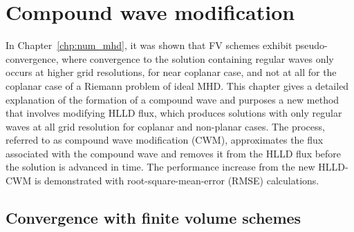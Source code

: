 %
%


\chapter[Compound wave modification]{Compound wave modification}
\label{chp:cwm}

In Chapter~\ref{chp:num_mhd}, it was shown that FV schemes exhibit pseudo-convergence, where convergence to the solution containing regular waves only occurs at higher grid resolutions, for near coplanar case, and not at all for the coplanar case of a Riemann problem of ideal MHD.  This chapter gives a detailed explanation of the formation of a compound wave and purposes a new method that involves modifying HLLD flux, which produces solutions with only regular waves at all grid resolution for coplanar and non-planar cases.  The process, referred to as compound wave modification (CWM), approximates the flux associated with the compound wave and removes it from the HLLD flux before the solution is advanced in time.  The performance increase from the new HLLD-CWM is demonstrated with root-square-mean-error (RMSE) calculations.  

\section[Convergence with finite volume schemes]{Convergence with finite volume schemes}
\label{sec:convergeFV}


